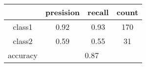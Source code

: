 
    \begin{tabular}{ | c | c | c | c | }
	\hline
	 & presision & recall & count \\ \hline
	class1 & 0.92 & 0.93 & 170 \\ \hline
	class2 & 0.59 & 0.55 & 31  \\ \hline
	\hline
	accuracy & \multicolumn{3}{c|}{0.87} \\
	\hline
    \end{tabular}